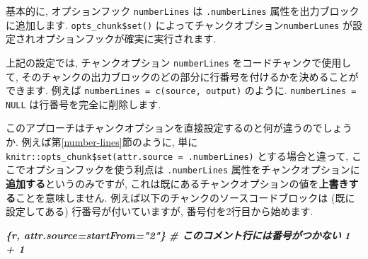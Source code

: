 \documentclass[
  11pt,
  lualatex,
  ja=standard]{bxjsreport}
\newenvironment{Shaded}{\begin{snugshade}}{\end{snugshade}}
\newcommand{\AttributeTok}[1]{\textcolor[rgb]{0.77,0.63,0.00}{#1}}
\newcommand{\ControlFlowTok}[1]{\textcolor[rgb]{0.13,0.29,0.53}{\textbf{#1}}}
\newcommand{\FunctionTok}[1]{\textcolor[rgb]{0.00,0.00,0.00}{#1}}
\newcommand{\InformationTok}[1]{\textcolor[rgb]{0.56,0.35,0.01}{\textbf{\textit{#1}}}}
\newcommand{\NormalTok}[1]{#1}
\newcommand{\OtherTok}[1]{\textcolor[rgb]{0.56,0.35,0.01}{#1}}
\newcommand{\SpecialCharTok}[1]{\textcolor[rgb]{0.00,0.00,0.00}{#1}}
\newcommand{\StringTok}[1]{\textcolor[rgb]{0.31,0.60,0.02}{#1}}
\begin{document}
\begin{Shaded}
\end{Shaded}

基本的に, オプションフック \texttt{numberLines} は \texttt{.numberLines} 属性を出力ブロックに追加します. \texttt{opts\_chunk\$set()} によってチャンクオプション\texttt{numberLunes} が設定されオプションフックが確実に実行されます.

上記の設定では, チャンクオプション \texttt{numberLines} をコードチャンクで使用して, そのチャンクの出力ブロックのどの部分に行番号を付けるかを決めることができます. 例えば \texttt{numberLines = c(\textquotesingle{}source\textquotesingle{},\ \textquotesingle{}output\textquotesingle{})} のように. \texttt{numberLines = NULL} は行番号を完全に削除します.

このアプローチはチャンクオプションを直接設定するのと何が違うのでしょうか. 例えば第\ref{number-lines}節のように, 単に \texttt{knitr::opts\_chunk\$set(attr.source = \textquotesingle{}.numberLines\textquotesingle{})} とする場合と違って, ここでオプションフックを使う利点は \texttt{.numberLines} 属性をチャンクオプションに\textbf{追加する}というのみですが, これは既にあるチャンクオプションの値を\textbf{上書きする}ことを意味しません. 例えば以下のチャンクのソースコードブロックは (既に設定してある) 行番号が付いていますが, 番号付を2行目から始めます.

\begin{Shaded}
\begin{Highlighting}[]
\InformationTok{\textasciigrave{}\textasciigrave{}\textasciigrave{}\{r, attr.source=\textquotesingle{}startFrom="2"\textquotesingle{}\}}
\InformationTok{\# このコメント行には番号がつかない}
\InformationTok{1 + 1}
\InformationTok{\textasciigrave{}\textasciigrave{}\textasciigrave{}}
\end{Highlighting}
\end{Shaded}
\end{document}
